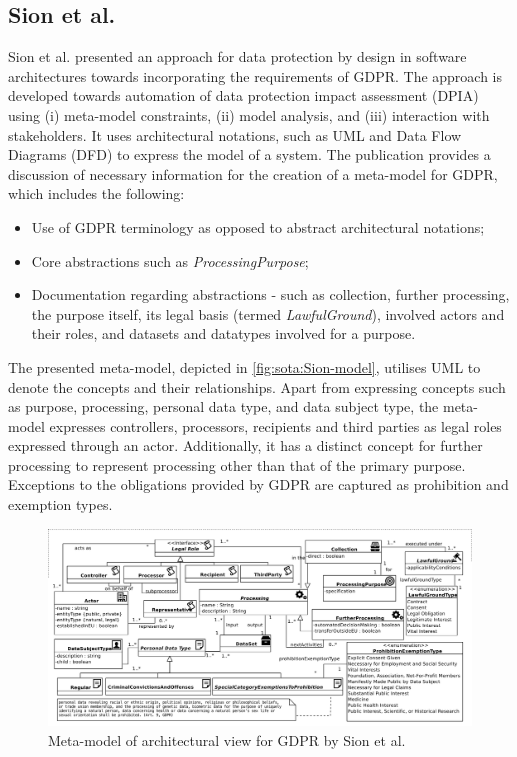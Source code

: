 \subsection{Sion et al.}
Sion et al. \cite{sion_architectural_2019} presented an approach for data protection by design in software architectures towards incorporating the requirements of GDPR. The approach is developed towards automation of data protection impact assessment (DPIA) using (i) meta-model constraints, (ii) model analysis, and  (iii) interaction with stakeholders. It uses architectural notations, such as UML and Data Flow Diagrams (DFD) to express the model of a system.  The publication provides a discussion of necessary information for the creation of a meta-model for GDPR, which includes the following:
\begin{itemize}
    \item Use of GDPR terminology as opposed to abstract architectural notations; 
    \item Core abstractions such as \textit{ProcessingPurpose};
    \item Documentation regarding abstractions - such as collection, further processing, the purpose itself, its legal basis (termed \textit{LawfulGround}), involved actors and their roles, and datasets and datatypes involved for a purpose.
\end{itemize}

The presented meta-model, depicted in \autoref{fig:sota:Sion-model}, utilises UML to denote the concepts and their relationships. Apart from expressing concepts such as purpose, processing, personal data type, and data subject type, the meta-model expresses controllers, processors, recipients and third parties as legal roles expressed through an actor. Additionally, it has a distinct concept for further processing to represent processing other than that of the primary purpose. Exceptions to the obligations provided by GDPR are captured as prohibition and exemption types.
\begin{figure}[htbp]
    \centering
    \includegraphics[width=\linewidth]{img/Sion_model.png}
    \caption{Meta-model of architectural view for GDPR by Sion et al. \cite{sion_architectural_2019}}
    \label{fig:sota:Sion-model}
\end{figure}

